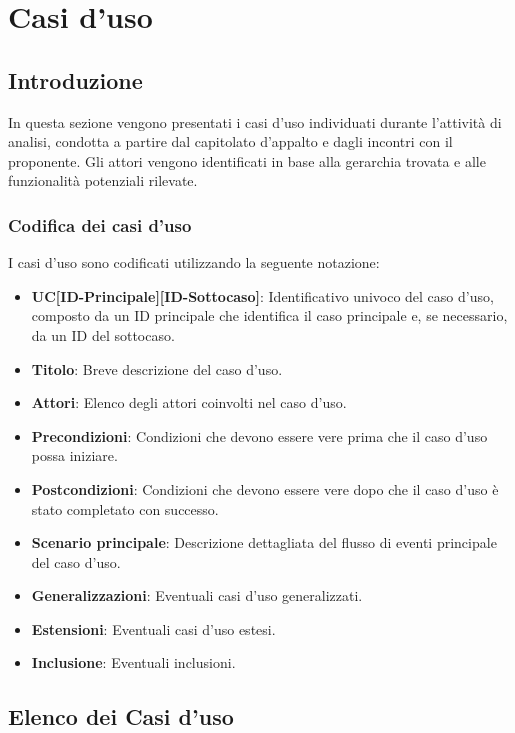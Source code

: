 \section{Casi d'uso}
\subsection{Introduzione}
In questa sezione vengono presentati i casi d'uso individuati durante l'attività di analisi, 
condotta a partire dal capitolato d'appalto e dagli incontri con il proponente. 
Gli attori vengono identificati in base alla gerarchia trovata e 
alle funzionalità potenziali rilevate.

\subsubsection{Codifica dei casi d'uso}
I casi d'uso sono codificati utilizzando la seguente notazione:

\begin{itemize}
    \item \textbf{UC[ID-Principale][ID-Sottocaso]}: Identificativo univoco del caso d'uso, composto da un ID principale che identifica il caso principale e, se necessario, da un ID del sottocaso.
    \item \textbf{Titolo}: Breve descrizione del caso d'uso.
    \item \textbf{Attori}: Elenco degli attori coinvolti nel caso d'uso.
    \item \textbf{Precondizioni}: Condizioni che devono essere vere prima che il caso d'uso possa iniziare.
    \item \textbf{Postcondizioni}: Condizioni che devono essere vere dopo che il caso d'uso è stato completato con successo.
    \item \textbf{Scenario principale}: Descrizione dettagliata del flusso di eventi principale del caso d'uso.
    \item \textbf{Generalizzazioni}: Eventuali casi d'uso generalizzati.
    \item \textbf{Estensioni}: Eventuali casi d'uso estesi.
    \item \textbf{Inclusione}: Eventuali inclusioni.
\end{itemize}
\newpage
\subsection{Elenco dei Casi d'uso}

